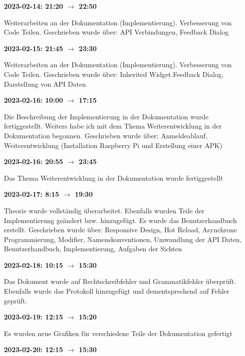 \vspace{0.5cm} \textbf{2023-02-14: 21:20 $\rightarrow$ 22:50} 

Weiterarbeiten an der Dokumentation (Implementierung). Verbesserung von Code Teilen. Geschrieben wurde über: API Verbindungen, Feedback Dialog

\vspace{0.5cm} \textbf{2023-02-15: 21:45 $\rightarrow$ 23:30} 

Weiterarbeiten an der Dokumentation (Implementierung). Verbesserung von Code Teilen. Geschrieben wurde über: Inherited Widget.Feedback Dialog, Darstellung von API Daten

\vspace{0.5cm} \textbf{2023-02-16: 10:00 $\rightarrow$ 17:15} 

Die Beschreibung der Implementierung in der Dokumentation wurde fertiggestellt. Weiters habe ich mit dem Thema Weiterentwicklung in der Dokumentation begonnen. Geschrieben wurde über: Anmeldeablauf, Weiterentwicklung (Installation Raspberry Pi und Erstellung einer APK) 

\vspace{0.5cm} \textbf{2023-02-16: 20:55 $\rightarrow$ 23:45} 

Das Thema Weiterentwicklung in der Dokumentation wurde fertiggestellt

\vspace{0.5cm} \textbf{2023-02-17: 8:15 $\rightarrow$ 19:30} 

Theorie wurde vollständig überarbeitet. Ebenfalls wurden Teile der Implementierung
geändert bzw. hinzugefügt. Es wurde das Benutzerhandbuch erstellt. Geschrieben wurde über: Responsive Design, Hot Reload, Asynchrone Programmierung, Modifier, Namenskonventionen, Umwandlung der API Daten, Benutzerhandbuch, Implementierung, Aufgaben der Sichten


\vspace{0.5cm} \textbf{2023-02-18: 10:15 $\rightarrow$ 15:30} 

Das Dokument wurde auf Rechtschreibfehler und Grammatikfehler überpr\"uft. Ebenfalls wurde das Protokoll hinzugef\"ugt und dementsprechend auf Fehler gepr\"uft.

\vspace{0.5cm} \textbf{2023-02-19: 12:15 $\rightarrow$ 15:20} 

Es wurden neue Grafiken f\"ur verschiedene Teile der Dokumentation gefertigt

\vspace{0.5cm} \textbf{2023-02-20: 12:15 $\rightarrow$ 15:30} 

